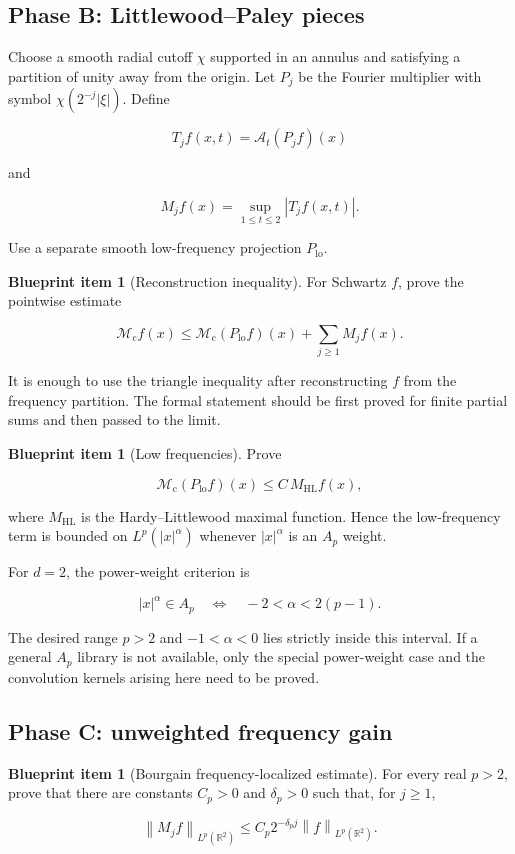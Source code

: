 \documentclass[11pt,a4paper]{article}
\theoremstyle{definition}
\newtheorem{blueprint}[theorem]{Blueprint item}
\theoremstyle{remark}
\newcommand{\R}{\mathbb{R}}
\newcommand{\Mc}{\mathcal{M}_{\mathrm{c}}}
\newcommand{\A}{\mathcal{A}}
\newcommand{\norm}[1]{\left\lVert #1\right\rVert}
\newcommand{\abs}[1]{\left\lvert #1\right\rvert}
\begin{document}
\subsection{Phase B: Littlewood--Paley pieces}

Choose a smooth radial cutoff $\chi$ supported in an annulus and satisfying a
partition of unity away from the origin.  Let $P_j$ be the Fourier multiplier
with symbol $\chi(2^{-j}\abs{\xi})$.  Define

\[
T_j f(x,t)=\A_t(P_jf)(x)
\]

and

\[
M_j f(x)=\sup_{1\leq t\leq2}\abs{T_jf(x,t)}.
\]

Use a separate smooth low-frequency projection $P_{\mathrm{lo}}$.

\begin{blueprint}[Reconstruction inequality]
For Schwartz $f$, prove the pointwise estimate

\[
\Mc f(x)
\leq
\Mc(P_{\mathrm{lo}}f)(x)
+
\sum_{j\geq1}M_jf(x).
\]

It is enough to use the triangle inequality after reconstructing $f$ from the
frequency partition.  The formal statement should be first proved for finite
partial sums and then passed to the limit.
\end{blueprint}

\begin{blueprint}[Low frequencies]
Prove

\[
\Mc(P_{\mathrm{lo}}f)(x)
\leq C\,M_{\mathrm{HL}}f(x),
\]

where $M_{\mathrm{HL}}$ is the Hardy--Littlewood maximal function.  Hence the
low-frequency term is bounded on $L^p(\abs{x}^{\alpha})$ whenever
$\abs{x}^{\alpha}$ is an $A_p$ weight.
\end{blueprint}

For $d=2$, the power-weight criterion is

\[
\abs{x}^{\alpha}\in A_p
\quad\Longleftrightarrow\quad
-2<\alpha<2(p-1).
\]

The desired range $p>2$ and $-1<\alpha<0$ lies strictly inside this interval.
If a general $A_p$ library is not available, only the special power-weight
case and the convolution kernels arising here need to be proved.

\subsection{Phase C: unweighted frequency gain}

\begin{blueprint}[Bourgain frequency-localized estimate]\label{bp:bourgain-piece}
For every real $p>2$, prove that there are constants $C_p>0$ and
$\delta_p>0$ such that, for $j\geq1$,

\[
\norm{M_jf}_{L^p(\R^2)}
\leq C_p2^{-\delta_pj}\norm{f}_{L^p(\R^2)}.
\]
\end{blueprint}
\end{document}
